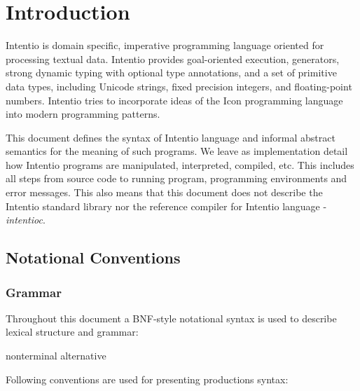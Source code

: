 \chapter{Introduction}

Intentio is domain specific, imperative programming language oriented for processing textual data. Intentio provides goal-oriented execution, generators, strong dynamic typing with optional type annotations, and a set of primitive data types, including Unicode strings, fixed precision integers, and floating-point numbers. Intentio tries to incorporate ideas of the Icon\cite{TheIconProgrammingLanguage} programming language into modern programming patterns.


This document defines the syntax of Intentio language and informal abstract semantics for the meaning of such programs. We leave as implementation detail how Intentio programs are manipulated, interpreted, compiled, etc. This includes all steps from source code to running program, programming environments and error messages. This also means that this document does not describe the Intentio standard library nor the reference compiler for Intentio language - \emph{intentioc}\cite{intentioc}.


\section{Notational Conventions}

\subsection*{Grammar}

Throughout this document a BNF-style notational syntax is used to describe lexical structure and grammar:

\begin{bnf}
  nonterminal \eq {} \gor alternative
\end{bnf}

Following conventions are used for presenting productions syntax:

